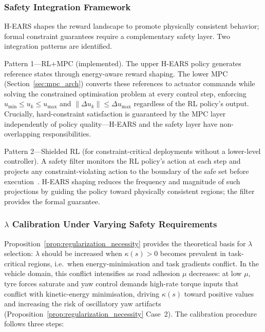 \documentclass[journal]{IEEEtran}
\begin{document}
	\subsubsection{Safety Integration Framework}
	\label{sec:safety_framework}
	
	H-EARS shapes the reward landscape to promote physically consistent behavior; formal constraint guarantees require a complementary safety layer. Two integration patterns are identified.
	
	Pattern 1---RL+MPC (implemented). The upper H-EARS policy generates reference states through energy-aware reward shaping. The lower MPC (Section~\ref{sec:mpc_arch}) converts these references to actuator commands while solving the constrained optimisation problem at every control step, enforcing $u_{\min}\leq u_k\leq u_{\max}$ and $\|\Delta u_k\|\leq\Delta u_{\max}$ regardless of the RL policy's output. Crucially, hard-constraint satisfaction is guaranteed by the MPC layer independently of policy quality---H-EARS and the safety layer have non-overlapping responsibilities.
	
	Pattern 2---Shielded RL (for constraint-critical deployments without a lower-level controller). A safety filter monitors the RL policy's action at each step and projects any constraint-violating action to the boundary of the safe set before execution~\cite{hewing2020learning}. H-EARS shaping reduces the frequency and magnitude of such projections by guiding the policy toward physically consistent regions; the filter provides the formal guarantee.
	
	\subsubsection{$\lambda$ Calibration Under Varying Safety Requirements}
	\label{sec:lambda_calib}
	
	Proposition~\ref{prop:regularization_necessity} provides the theoretical basis for $\lambda$ selection: $\lambda$ should be increased when $\kappa(s)>0$ becomes prevalent in task-critical regions, i.e.\ when energy-minimisation and task gradients conflict. In the vehicle domain, this conflict intensifies as road adhesion $\mu$ decreases: at low $\mu$, tyre forces saturate and yaw control demands high-rate torque inputs that conflict with kinetic-energy minimisation, driving $\kappa(s)$ toward positive values and increasing the risk of oscillatory yaw artifacts (Proposition~\ref{prop:regularization_necessity} Case~2). The calibration procedure follows three steps:
	
\end{document}
